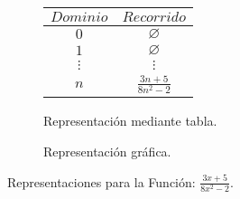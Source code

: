 \begin{figure}[h]
\centering
\begin{subfigure}[A]{0.3\textwidth}
\centering
\begin{tabular}{c|c}
$Dominio$ & $Recorrido$ \\ \hline
\hline
$0$ & $\varnothing$ \\ \hline
$1$ & $\varnothing$ \\ \hline
$\vdots$ & $\vdots$ \\ \hline
$n$& $\frac{3 n + 5}{8n^2 - 2}$ \\ \hline
\end{tabular} 
\caption{Representación mediante tabla.}

\end{subfigure}%
\quad
\begin{subfigure}[B]{0.3\textwidth}
\centering



\caption{Representación gráfica.}

\end{subfigure}

\caption{Representaciones para la Función: $\frac{3 x + 5}{8 x^2 - 2}$.}

\end{figure}

